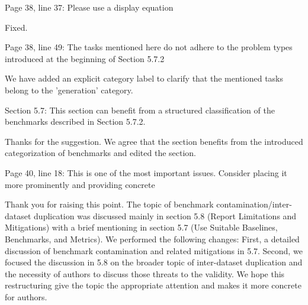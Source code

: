 \documentclass[12pt,english]{reviewresponse}
\begin{document}
\begin{revcomment}
Page 38, line 37: Please use a display equation
\end{revcomment}
\begin{revresponse}
    Fixed.
\end{revresponse}

\begin{revcomment}
Page 38, line 49: The tasks mentioned here do not adhere to the problem types introduced at the beginning of Section 5.7.2
\end{revcomment}
\begin{revresponse}
    We have added an explicit category label to clarify that the mentioned tasks belong to the 'generation' category.
\end{revresponse}

\begin{revcomment}
Section 5.7: This section can benefit from a structured classification of the benchmarks described in Section 5.7.2.
\end{revcomment}
\begin{revresponse}
    Thanks for the suggestion. We agree that the section benefits from the introduced categorization of benchmarks and edited the section.
\end{revresponse}

\begin{revcomment}
Page 40, line 18: This is one of the most important issues. Consider placing it more prominently and providing concrete
\end{revcomment}
\begin{revresponse}
    Thank you for raising this point. The topic of benchmark contamination/inter-dataset duplication was discussed mainly in section 5.8 (Report Limitations and Mitigations) with a brief mentioning in section 5.7 (Use Suitable Baselines, Benchmarks, and Metrics). We performed the following changes: First, a detailed discussion of benchmark contamination and related mitigations in 5.7. Second, we focused the discussion in 5.8 on the broader topic of inter-dataset duplication and the necessity of authors to discuss those threats to the validity. We hope this restructuring give the topic the appropriate attention and makes it more concrete for authors.
\end{revresponse}
\end{document}
